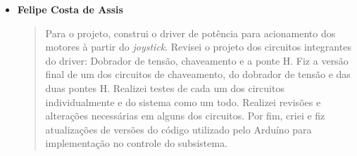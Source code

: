 \begin{itemize}
  \item \textbf{Felipe Costa de Assis}
    \begin{quote}
      Para o projeto, construi o driver de potência para acionamento dos motores
      à partir do \textit{joystick}. Revisei o projeto dos circuitos integrantes
      do driver: Dobrador de tensão, chaveamento e a ponte H. Fiz a versão final
      de um dos circuitos de chaveamento, do dobrador de tensão e das duas pontes
      H. Realizei testes de cada um dos circuitos individualmente e do sistema
      como um todo. Realizei revisões e alterações necessárias em alguns dos
      circuitos. Por fim, criei e fiz atualizações de versões do código utilizado
      pelo Arduíno para implementação no controle do subsistema.
    \end{quote}
\end{itemize}
